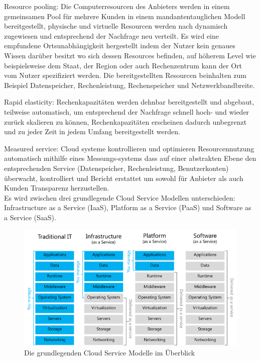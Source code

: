 Resource pooling: Die Computerresourcen des Anbieters werden in einem gemeinsamen Pool
für mehrere Kunden in einem mandantentauglichen Modell bereitgestellt, physische und
virtuelle Resourcen werden nach dynamisch zugewiesen und entsprechend der Nachfrage
neu verteilt. Es wird eine empfundene Ortsunabhängigkeit hergestellt indem der Nutzer
kein genaues Wissen darüber besitzt wo sich dessen Resources befinden, auf höherem
Level wie beispielsweise dem Staat, der Region oder auch Rechenzentrum kann
der Ort vom Nutzer spezifiziert werden. Die bereitgestellten Resourcen beinhalten
zum Beispiel Datenspeicher, Rechenleistung, Rechenspeicher und Netzwerkbandbreite.

Rapid elasticity: Rechenkapazitäten werden dehnbar bereitgestellt und abgebaut,
teilweise automatisch, um entsprechend der Nachfrage schnell hoch- und wieder
zurück skalieren zu können, Rechenkapazitäten erscheinen dadurch unbegrenzt und
zu jeder Zeit in jedem Umfang bereitgestellt werden.

Measured service: Cloud systeme kontrollieren und optimieren Resourcennutzung
automatisch mithilfe eines Messungs-systems dass auf einer abstrakten Ebene den
entsprechenden Service (Datenspeicher, Rechenleistung, Benutzerkonten) überwacht,
kontrolliert und Bericht erstattet um sowohl für Anbieter als auch Kunden Transparenz
herzustellen.\\

Es wird zwischen drei grundlegende Cloud Service Modellen unterschieden: Infrastructure
as a Service (IaaS), Platform as a Service (PaaS) und Software as a Service (SaaS).

\begin{figure}[H]
  \includegraphics[width=1.0\textwidth]{fig/ch-hauptteil/Service-Models.png}
  \caption{Die grundlegenden Cloud Service Modelle im Überblick}
  \centering
\end{figure}

